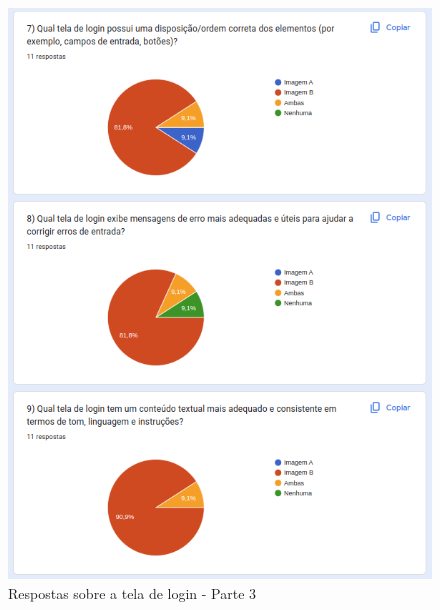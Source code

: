\begin{figure}[!h]
	\begin{center}
	    \includegraphics[scale=0.7]{figs/Answers/Professionals/06.png}
	\end{center}
	\caption{\label{APC_TL03}Respostas sobre a tela de login - Parte 3}
\end{figure}

\newpage

